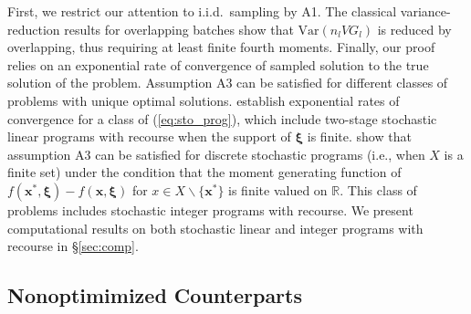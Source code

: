 \documentclass[12pt]{article}
\newcommand{\R}{{\mathbb{R}}}
\newcommand{\e}[1]{\mathbb{E} \left[ #1 \right]
}
\newcommand{\var}[1]{\mathrm{Var} \left( #1 \right)}
\newcommand{\x}{\mathbf{x}}
\newcommand{\xs}{\x^*}
\newcommand{\xit}{\boldsymbol{\xi}}
\begin{document}
First, we restrict our attention to i.i.d.\ sampling by A1.
The classical variance-reduction results for overlapping batches show that $\var{n_l VG_l}$ is reduced by overlapping, thus requiring at least finite fourth moments. 
Finally, our proof relies on an exponential rate of convergence of sampled solution to the true solution of the problem.  
Assumption A3 can be satisfied for different classes of problems with unique optimal solutions.  
\citet{shapiro2000rate} establish exponential rates of convergence for a class of (\ref{eq:sto_prog}), which include two-stage stochastic linear programs with recourse when the support of $\xit$ is finite.   
\citet{kleywegt2002sample} show that assumption A3 can be satisfied for discrete stochastic programs (i.e., when $X$ is a finite set) under the condition that the moment generating function of $f(\xs,\xit) - f(\x,\xit)$ for $x \in X \backslash \{\xs\}$ is finite valued on $\R$.  
This class of problems includes stochastic integer programs with recourse.
  We present computational results on both stochastic linear and integer programs with recourse in \S \ref{sec:comp}.





\subsection{Nonoptimimized Counterparts}
\label{subsec:nonO}
\end{document}
